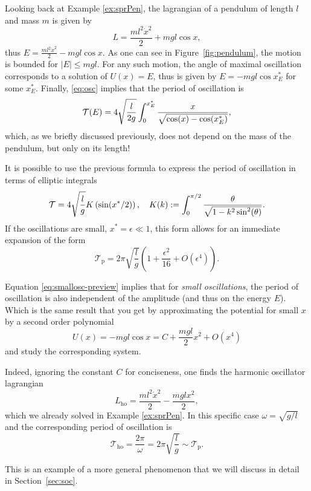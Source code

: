 \documentclass[english,fontsize=11pt,paper=a5,oneside]{scrbook}
\newcommand{\cT}{\mathcal{T}}
\let\d\relax
\newcommand{\d}{\mathrm{d}}
\theoremstyle{definition}
\newenvironment{example}
  {\pushQED{\qed}\renewcommand{\qedsymbol}{$\lozenge$}\examplex}
  {\popQED\endexamplex}
\begin{document}
\begin{example}\label{ex:small-osc}
  Looking back at Example \ref{ex:sprPen}, the lagrangian of a pendulum of length $l$ and mass $m$ is given by
  \begin{equation}
    L = \frac{ml^2 \dot x^2}2 + mgl \cos x,
  \end{equation}
  thus $E = \frac{ml^2 \dot x^2}2 - mgl \cos x$.
  As one can see in Figure~\ref{fig:pendulum}, the motion is bounded for $|E| \leq mgl$. For any such motion, the angle of maximal oscillation corresponds to a solution of $U(x) = E$, thus is given by $E = -mgl \cos x^*_E$ for some $x^*_E$.
  Finally, \eqref{eq:osc} implies that the period of oscillation is
  \begin{equation}
    \cT(E) = 4 \sqrt{\frac l{2g}} \int_0^{x^*_E} \frac{\d x}{\sqrt{\cos(x) - \cos(x^*_E)}},
  \end{equation}
  which, as we briefly discussed previously, does not depend on the mass of the pendulum, but only on its length!

  It is possible to use the previous formula to express the period of oscillation in terms of elliptic integrals
  \begin{equation}
    \cT = 4 \sqrt{\frac lg} K\left (\sin(x^*/2)\right), \quad
    K(k):= \int_0^{\pi/2} \frac{\d \theta}{\sqrt{1 - k^2\sin^2(\theta)}}.
  \end{equation}
  If the oscillations are small, $x^* = \epsilon \ll 1$, this form allows for an immediate expansion of the form
  \begin{equation}\label{eq:smallosc-preview}
    \cT_\mathrm{p} = 2\pi \sqrt{\frac lg} \left(1 + \frac{\epsilon^2}{16} + O(\epsilon^4)\right).
  \end{equation}

  Equation \eqref{eq:smallosc-preview} implies that for \emph{small oscillations}, the period of oscillation is also independent of the amplitude (and thus on the energy $E$). Which is the same result that you get by approximating the potential for small $x$ by a second order polynomial
  \begin{equation}
    U(x) = -mgl \cos x = C + \frac{mgl}2 x^2 + O(x^4)
  \end{equation}
  and study the corresponding system.

  Indeed, ignoring the constant $C$ for conciseness, one finds the harmonic oscillator lagrangian
  \begin{equation}
    L_{\mathrm{ho}} = \frac{ml^2 \dot x^2}{2} - \frac{mgl x^2}{2},
  \end{equation}
  which we already solved in Example \ref{ex:sprPen}.
  In this specific case $\omega = \sqrt{g/l}$ and the corresponding period of oscillation is
  \begin{equation}
    \cT_{\mathrm{ho}} = \frac{2\pi}\omega = 2\pi \sqrt{\frac lg} \sim \cT_\mathrm{p}.
  \end{equation}

  This is an example of a more general phenomenon that we will discuss in detail in Section~\ref{sec:soc}.
\end{example}
\end{document}
